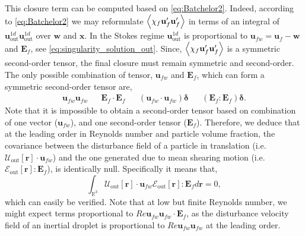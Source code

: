 This closure term can be computed based on \ref{eq:Batchelor2}. 
Indeed, according to \ref{eq:Batchelor2} we may reformulate $\left<\chi_f \textbf{u}_f'\textbf{u}_f'\right>$ in terms of an integral of $\textbf{u}_\text{out}^{1d}\textbf{u}_\text{out}^{1d}$ over $\textbf{w}$ and $\textbf{x}$. 
In the Stokes regime $\textbf{u}_\text{out}^{1d}$ is proportional to $\textbf{u}_{fw} = \textbf{u}_f - \textbf{w}$ and $\textbf{E}_f$, see \ref{eq:singularity_solution_out}. 
Since, $\left<\chi_f \textbf{u}_f'\textbf{u}_f'\right>$ is a symmetric second-order tensor, the final closure must remain symmetric and second-order.
The only possible combination of tensor, $\textbf{u}_{fw}$ and $\textbf{E}_f$, which can form a symmetric second-order tensor are, 
\begin{align}
    \textbf{u}_{fw}
    \textbf{u}_{fw}
    &&
    \textbf{E}_f\cdot \textbf{E}_f
    && 
    (\textbf{u}_{fw}\cdot 
    \textbf{u}_{fw})\bm\delta
    &&
    (\textbf{E}_f : \textbf{E}_f)\bm\delta. 
\end{align}
Note that it is impossible to obtain a second-order tensor based on combination of one vector ($\textbf{u}_{fw}$), and one second-order tensor ($\textbf{E}_f$). 
Therefore, we deduce that at the leading order in Reynolds number and particle volume fraction, the covariance between the disturbance field of a particle in translation (i.e. $\mathcal{U}_\text{out}[\textbf{r}] \cdot \textbf{u}_{fw}$) and the one generated due to mean shearing motion (i.e. $\mathcal{E}_\text{out}[\textbf{r}]: \textbf{E}_{f}$), is identically null. 
Specifically it means that,
\begin{equation}
    \int_{\mathbb{R}^3} \mathcal{U}_\text{out}[\textbf{r}] \cdot \textbf{u}_{fw}
     \mathcal{E}_\text{out}[\textbf{r}]: \textbf{E}_{f} d\textbf{r} = 0,
\end{equation}
which can easily be verified. 
Note that at low but finite Reynolds number, we might expect terms proportional to $Re \textbf{u}_{fw}\textbf{u}_{fw} \cdot \textbf{E}_f$, as the disturbance velocity field of an inertial droplet is proportional to $Re \textbf{u}_{fw}\textbf{u}_{fw}$ at the leading order. 

